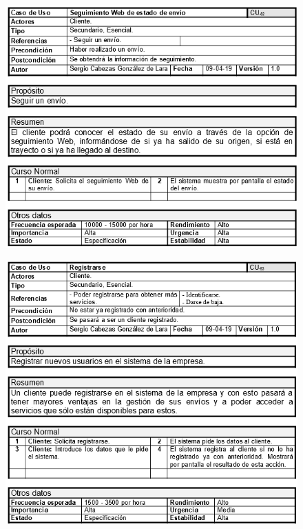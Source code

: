 \begin{figure}[H]
	\centering
	\includegraphics[width=16cm]{52}
\end{figure}
\begin{figure}[H]
	\centering
	\includegraphics[width=16cm]{53}
\end{figure}
